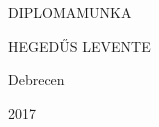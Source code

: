 \documentclass{memoir}
\begin{document}
\begin{center}
\begin{vplace}[0.8]
\HUGE DIPLOMAMUNKA
\end{vplace}
\end{center}

\begin{flushright}
\begin{vplace}[0.7]
\LARGE HEGEDŰS LEVENTE
\end{vplace}
\end{flushright}

\LARGE{
\begin{center}
Debrecen

2017
\end{center}
}
\end{document}
